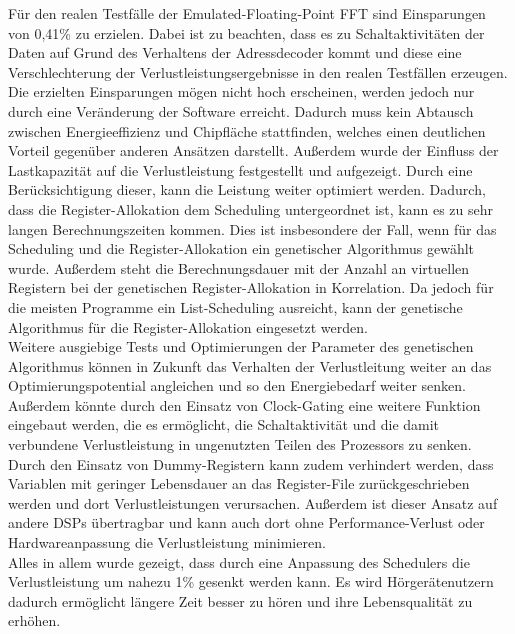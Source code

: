 Für den realen Testfälle der Emulated-Floating-Point FFT sind Einsparungen von 0,41\% zu erzielen. Dabei ist zu beachten, dass es zu Schaltaktivitäten der Daten auf Grund des Verhaltens der Adressdecoder kommt und diese eine Verschlechterung der Verlustleistungsergebnisse in den realen Testfällen erzeugen.
Die erzielten Einsparungen mögen nicht hoch erscheinen, werden jedoch nur durch eine Veränderung der Software erreicht. Dadurch muss kein Abtausch zwischen Energieeffizienz und Chipfläche stattfinden, welches einen deutlichen Vorteil gegenüber anderen Ansätzen darstellt.
Außerdem wurde der Einfluss der Lastkapazität auf die Verlustleistung festgestellt und aufgezeigt. Durch eine Berücksichtigung dieser, kann die Leistung weiter optimiert werden.
Dadurch, dass die Register-Allokation dem Scheduling untergeordnet ist, kann es zu sehr langen Berechnungszeiten kommen. Dies ist insbesondere der Fall, wenn für das Scheduling und die Register-Allokation ein genetischer Algorithmus gewählt wurde. Außerdem steht die Berechnungsdauer mit der Anzahl an virtuellen Registern bei der genetischen Register-Allokation in Korrelation. Da jedoch für die meisten Programme ein List-Scheduling ausreicht, kann der genetische Algorithmus für die Register-Allokation eingesetzt werden.\\
Weitere ausgiebige Tests und Optimierungen der Parameter des genetischen Algorithmus können in Zukunft das Verhalten der Verlustleitung weiter an das Optimierungspotential angleichen und so den Energiebedarf weiter senken. Außerdem könnte durch den Einsatz von Clock-Gating eine weitere Funktion eingebaut werden, die es ermöglicht, die Schaltaktivität und die damit verbundene Verlustleistung in ungenutzten Teilen des Prozessors zu senken. Durch den Einsatz von Dummy-Registern kann zudem verhindert werden, dass Variablen mit geringer Lebensdauer an das Register-File zurückgeschrieben werden und dort Verlustleistungen verursachen. Außerdem ist dieser Ansatz auf andere DSPs übertragbar und kann auch dort ohne Performance-Verlust oder Hardwareanpassung die Verlustleistung minimieren.\\
Alles in allem wurde gezeigt, dass durch eine Anpassung des Schedulers die Verlustleistung um nahezu 1\% gesenkt werden kann. Es wird Hörgerätenutzern dadurch ermöglicht längere Zeit besser zu hören und ihre Lebensqualität zu erhöhen.\\
%


